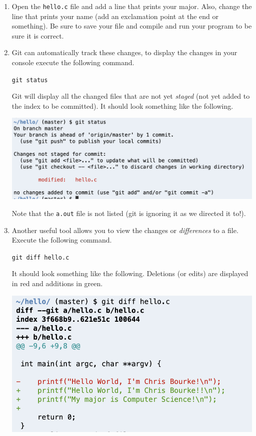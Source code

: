 \documentclass[12pt]{scrartcl}
\begin{document}
\begin{enumerate}
  \item Open the \texttt{hello.c} file and add a line that
  prints your major.  Also, change the line that prints your name
  (add an exclamation point at the end or something).  Be sure to
  save your file and compile and run your program to be sure it is 
  correct.

  \item Git can automatically track these changes, to display the
  changes in your console execute the following command.
  
  \texttt{git status}
  
  Git will display all the changed files that are not yet \emph{staged}
  (not yet added to the index to be committed).  It should look
  something like the following.
  
  \begin{center}
  \includegraphics[scale=0.5]{./hack1.0-files/cl-gitstatus}
  \end{center}
  
  Note that the \texttt{a.out} file is not listed (git
  is ignoring it as we directed it to!).
  
  \item Another useful tool allows you to view the changes or
  \emph{differences} to a file.  Execute the following command.
  
  \texttt{git diff hello.c}

  It should look something like the following.  Deletions (or edits)
  are displayed in red and additions in green.

  \begin{center}
  \includegraphics[scale=0.5]{./hack1.0-files/cl-gitdiff}
  \end{center}
  

\end{enumerate}
\end{document}
